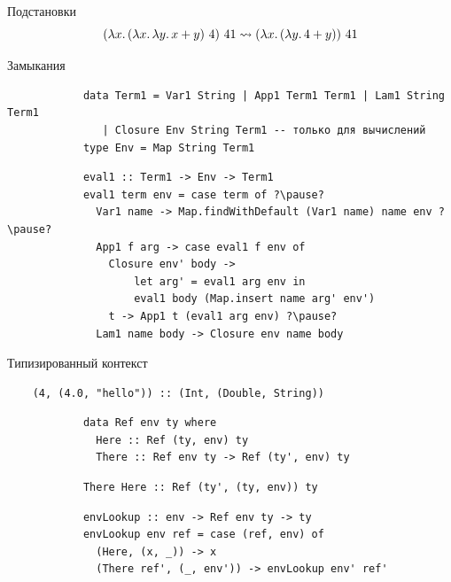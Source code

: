     \begin{frame}[fragile]{Подстановки}
        \pause
        \[
            (\lambda x\ldotp (\lambda x\ldotp \lambda y\ldotp x + y) ~ 4) ~ 41 \rightsquigarrow (\lambda x\ldotp (\lambda y\ldotp 4 + y)) ~ 41
        \]
    \end{frame}

    \begin{frame}[fragile]{Замыкания}
        \pause
        \begin{verbatim}
            data Term1 = Var1 String | App1 Term1 Term1 | Lam1 String Term1
               | Closure Env String Term1 -- только для вычислений
            type Env = Map String Term1
        \end{verbatim}
        \pause\vspace{1em}
        \begin{verbatim}
            eval1 :: Term1 -> Env -> Term1
            eval1 term env = case term of ?\pause?
              Var1 name -> Map.findWithDefault (Var1 name) name env ?\pause?
              App1 f arg -> case eval1 f env of
                Closure env' body ->
                    let arg' = eval1 arg env in
                    eval1 body (Map.insert name arg' env')
                t -> App1 t (eval1 arg env) ?\pause?
              Lam1 name body -> Closure env name body
        \end{verbatim}
    \end{frame}

    \begin{frame}[fragile]{Типизированный контекст}
        \pause
        \begin{verbatim}
    (4, (4.0, "hello")) :: (Int, (Double, String))
        \end{verbatim}
        \pause\vspace{1em}
        \begin{verbatim}
            data Ref env ty where
              Here :: Ref (ty, env) ty
              There :: Ref env ty -> Ref (ty', env) ty
        \end{verbatim}
        \pause\vspace{1em}
        \begin{verbatim}
            There Here :: Ref (ty', (ty, env)) ty
        \end{verbatim}
        \pause\vspace{1em}
        \begin{verbatim}
            envLookup :: env -> Ref env ty -> ty
            envLookup env ref = case (ref, env) of
              (Here, (x, _)) -> x
              (There ref', (_, env')) -> envLookup env' ref'
        \end{verbatim}
    \end{frame}


